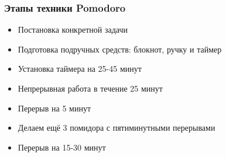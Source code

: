 \documentclass{../industrial-development}
\begin{document}
\begin{frame} \frametitle{Этапы техники Pomodoro}
  \begin{itemize}
  \item Постановка конкретной задачи
  \item Подготовка подручных средств: блокнот, ручку и таймер
  \item Установка таймера на 25-45 минут
  \item Непрерывная работа в течение 25 минут
  \item Перерыв на 5 минут
  \item Делаем ещё 3 помидора с пятиминутными перерывами
  \item Перерыв на 15-30 минут
  \end{itemize}
\end{frame}

\lecturenotes
\end{document}

